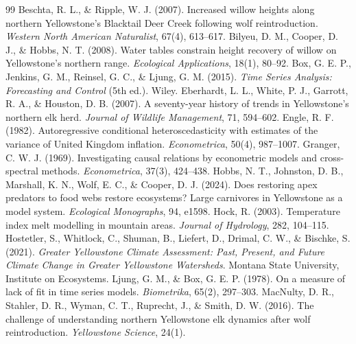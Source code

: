 \documentclass[11pt,a4paper]{article}
\begin{document}
\newpage
\begin{thebibliography}{99}\small
{} Beschta, R. L., \& Ripple, W. J. (2007). Increased willow heights along northern Yellowstone's Blacktail Deer Creek following wolf reintroduction. \emph{Western North American Naturalist}, 67(4), 613--617.
 Bilyeu, D. M., Cooper, D. J., \& Hobbs, N. T. (2008). Water tables constrain height recovery of willow on Yellowstone's northern range. \emph{Ecological Applications}, 18(1), 80--92.
 Box, G. E. P., Jenkins, G. M., Reinsel, G. C., \& Ljung, G. M. (2015). \emph{Time Series Analysis: Forecasting and Control} (5th ed.). Wiley.
 Eberhardt, L. L., White, P. J., Garrott, R. A., \& Houston, D. B. (2007). A seventy-year history of trends in Yellowstone's northern elk herd. \emph{Journal of Wildlife Management}, 71, 594--602.
 Engle, R. F. (1982). Autoregressive conditional heteroscedasticity with estimates of the variance of United Kingdom inflation. \emph{Econometrica}, 50(4), 987--1007.
 Granger, C. W. J. (1969). Investigating causal relations by econometric models and cross-spectral methods. \emph{Econometrica}, 37(3), 424--438.
 Hobbs, N. T., Johnston, D. B., Marshall, K. N., Wolf, E. C., \& Cooper, D. J. (2024). Does restoring apex predators to food webs restore ecosystems? Large carnivores in Yellowstone as a model system. \emph{Ecological Monographs}, 94, e1598.
 Hock, R. (2003). Temperature index melt modelling in mountain areas. \emph{Journal of Hydrology}, 282, 104--115.
 Hostetler, S., Whitlock, C., Shuman, B., Liefert, D., Drimal, C. W., \& Bischke, S. (2021). \emph{Greater Yellowstone Climate Assessment: Past, Present, and Future Climate Change in Greater Yellowstone Watersheds}. Montana State University, Institute on Ecosystems.
 Ljung, G. M., \& Box, G. E. P. (1978). On a measure of lack of fit in time series models. \emph{Biometrika}, 65(2), 297--303.
 MacNulty, D. R., Stahler, D. R., Wyman, C. T., Ruprecht, J., \& Smith, D. W. (2016). The challenge of understanding northern Yellowstone elk dynamics after wolf reintroduction. \emph{Yellowstone Science}, 24(1).

\end{thebibliography}
\end{document}
